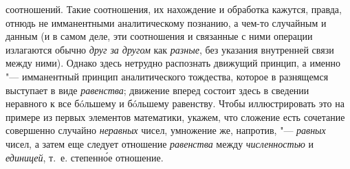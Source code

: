 соотношений. Такие соотношения, их нахождение и обработка кажутся, правда,
отнюдь не имманентными аналитическому познанию, а чем-то
случайным и данным (и в самом деле, эти соотношения и связанные с ними
операции излагаются обычно {\em друг за
другом} как
{\em разные}, без
указания внутренней связи между ними). Однако здесь нетрудно распознать
движущий принцип, а именно "--- имманентный принцип
аналитического тождества, которое в разнящемся выступает в виде
{\em равенства}; движение
вперед состоит здесь в сведении неравного к все бóльшему и бóльшему
равенству. Чтобы иллюстрировать это на примере из первых элементов
математики, укажем, что сложение есть сочетание совершенно случайно
{\em неравных} чисел, умножение же, напротив, "--- {\em равных}
чисел, а затем еще следует отношение {\em равенства} между {\em численностью}
и {\em единицей}, т.~е. степенн\'{о}е отношение.

